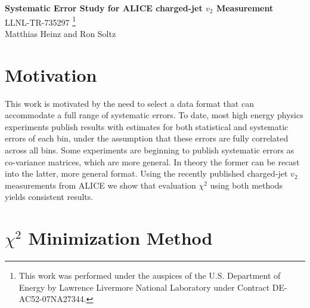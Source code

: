\documentclass[11pt]{article}
\begin{document}
\renewcommand{\textfraction}{0.1}
\renewcommand{\topfraction}{0.9}
\renewcommand{\bottomfraction}{0.9}
\renewcommand{\floatpagefraction}{0.1}

\begin{center}
{\Large \bf Systematic Error Study for ALICE charged-jet $v_2$ Measurement}\\
\bigskip
LLNL-TR-735297
\footnote{This work was performed under the auspices of the U.S. Department of Energy by Lawrence Livermore National Laboratory under Contract DE-AC52-07NA27344.}
\\
\bigskip
Matthias Heinz and Ron Soltz
\end{center}

\begin{abstract}
We study the treatment of systematic errors in the determination of $v_2$ for charged jets in $\sqrt{s_{NN}}=2.76$~TeV Pb-Pb collisions by the ALICE Collaboration~\cite{Adam:2016ix}. Working with the reported values and errors for the 0-5\% centrality data we evaluate the $\chi^2$ according to the formulas given for the statistical and systematic errors, where the latter are separated into correlated and shape contributions. We reproduce both the $\chi^2$ and $p$-values relative to a null (zero) result. We then re-cast the systematic errors into an equivalent co-variance matrix and obtain identical results, demonstrating that the two methods are equivalent. 
\end{abstract}

\section{Motivation}

This work is motivated by the need to select a data format that can accommodate a full range of systematic errors. To date, most high energy physics experiments publish results with estimates for both statistical and systematic errors of each bin, under the assumption that these errors are fully correlated across all bins. Some experiments are beginning to publish systematic errors as co-variance matrices, which are more general. In theory the former can be recast into the latter, more general format. Using the recently published charged-jet $v_2$ measurements from ALICE we show that evaluation $\chi^2$ using both methods yields consistent results.

\section{$\chi^2$ Minimization Method}
\end{document}
